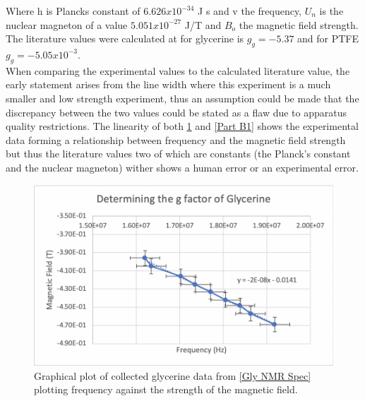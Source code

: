 \documentclass[12pt]{article}
\begin{document}
Where h is Plancks constant of $6.626x10^{-34}$ J s and v the frequency, $U_n$ is the nuclear magneton of a value $5.051x10^{-27}$ J/T and $B_o$ the magnetic field strength. The literature values were calculated at for glycerine is $g_g=-5.37$ and for PTFE $g_g=-5.05x10^{-3}$. \\

When comparing the experimental values to the calculated literature value, the early statement arises from the line width where this experiment is a much smaller and low strength experiment, thus an assumption could be made that the discrepancy between the two values could be stated as a flaw due to apparatus quality restrictions. The linearity of both \cref{Part B2} and \cref{Part B1} shows the experimental data forming a relationship between frequency and the magnetic field strength but thus the literature values two of which are constants (the Planck's constant and the nuclear magneton) wither shows a human error or an experimental error. \\

\begin{figure}[H]
\centering
\includegraphics[scale=0.8]{Images/Report/Part B1/Screenshot 2020-12-02 at 20.43.19.png}
\caption{Graphical plot of collected glycerine data from \cref{Gly NMR Spec} plotting frequency against the strength of the magnetic field.}
\label{Part B2}
\end{figure}
\end{document}
